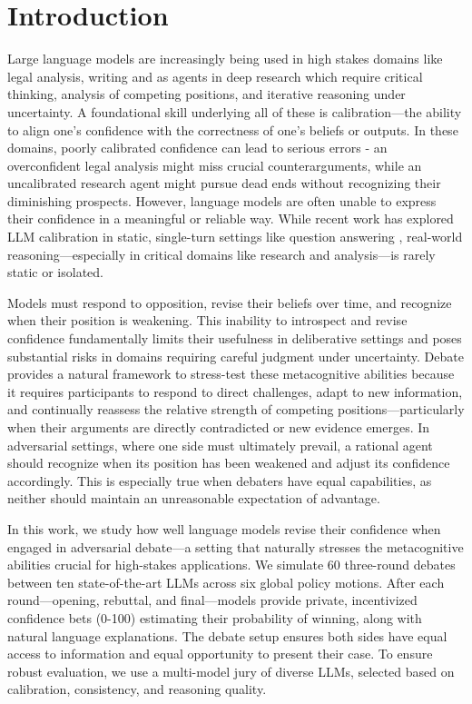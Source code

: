 \documentclass{article}
\begin{document}
\section{Introduction}
Large language models are increasingly being used in high stakes domains like legal analysis, writing and as agents in deep research \cite{handa2025economictasksperformedai} \cite{zheng2025deepresearcherscalingdeepresearch} which require critical thinking, analysis of competing positions, and iterative reasoning under uncertainty. A foundational skill underlying all of these is calibration—the ability to align one's confidence with the correctness of one's beliefs or outputs. In these domains, poorly calibrated confidence can lead to serious errors - an overconfident legal analysis might miss crucial counterarguments, while an uncalibrated research agent might pursue dead ends without recognizing their diminishing prospects. However, language models are often unable to express their confidence in a meaningful or reliable way. While recent work has explored LLM calibration in static, single-turn settings like question answering \citep{tian2023justask, xiong2024uncertainty, kadavath2022know}, real-world reasoning—especially in critical domains like research and analysis—is rarely static or isolated.

Models must respond to opposition, revise their beliefs over time, and recognize when their position is weakening. This inability to introspect and revise confidence fundamentally limits their usefulness in deliberative settings and poses substantial risks in domains requiring careful judgment under uncertainty. Debate provides a natural framework to stress-test these metacognitive abilities because it requires participants to respond to direct challenges, adapt to new information, and continually reassess the relative strength of competing positions—particularly when their arguments are directly contradicted or new evidence emerges. In adversarial settings, where one side must ultimately prevail, a rational agent should recognize when its position has been weakened and adjust its confidence accordingly. This is especially true when debaters have equal capabilities, as neither should maintain an unreasonable expectation of advantage.

In this work, we study how well language models revise their confidence when engaged in adversarial debate—a setting that naturally stresses the metacognitive abilities crucial for high-stakes applications. We simulate 60 three-round debates between ten state-of-the-art LLMs across six global policy motions. After each round—opening, rebuttal, and final—models provide private, incentivized confidence bets (0-100) estimating their probability of winning, along with natural language explanations. The debate setup ensures both sides have equal access to information and equal opportunity to present their case. To ensure robust evaluation, we use a multi-model jury of diverse LLMs, selected based on calibration, consistency, and reasoning quality.
\end{document}
